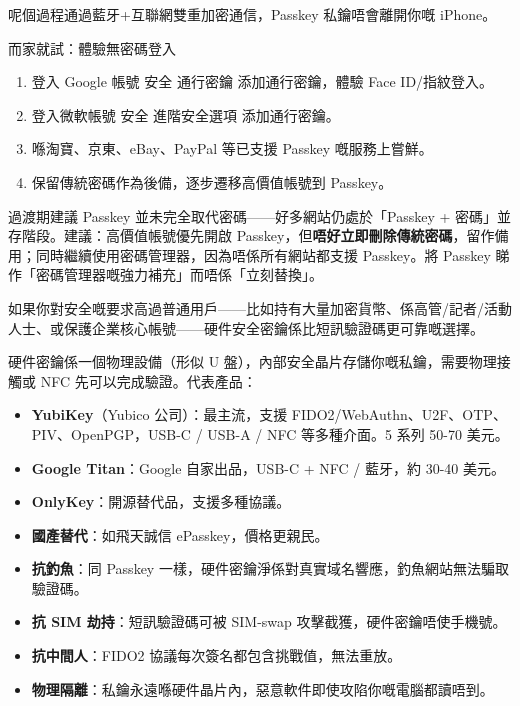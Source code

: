 呢個過程通過藍牙+互聯網雙重加密通信，Passkey 私鑰唔會離開你嘅 iPhone。

\begin{tcbpractice}{而家就試：體驗無密碼登入}
\begin{enumerate}
  \item 登入 Google 帳號 安全 通行密鑰 添加通行密鑰，體驗 Face ID/指紋登入。
  \item 登入微軟帳號 安全 進階安全選項 添加通行密鑰。
  \item 喺淘寶、京東、eBay、PayPal 等已支援 Passkey 嘅服務上嘗鮮。
  \item 保留傳統密碼作為後備，逐步遷移高價值帳號到 Passkey。
\end{enumerate}

\end{tcbpractice}

\begin{tcbwarn}{過渡期建議}
Passkey 並未完全取代密碼——好多網站仍處於「Passkey + 密碼」並存階段。建議：高價值帳號優先開啟 Passkey，但\textbf{唔好立即刪除傳統密碼}，留作備用；同時繼續使用密碼管理器，因為唔係所有網站都支援 Passkey。將 Passkey 睇作「密碼管理器嘅強力補充」而唔係「立刻替換」。

\end{tcbwarn}


如果你對安全嘅要求高過普通用戶——比如持有大量加密貨幣、係高管/記者/活動人士、或保護企業核心帳號——硬件安全密鑰係比短訊驗證碼更可靠嘅選擇。


硬件密鑰係一個物理設備（形似 U 盤），內部安全晶片存儲你嘅私鑰，需要物理接觸或 NFC 先可以完成驗證。代表產品：

\begin{itemize}
  \item \textbf{YubiKey}（Yubico 公司）：最主流，支援 FIDO2/WebAuthn、U2F、OTP、PIV、OpenPGP，USB-C / USB-A / NFC 等多種介面。5 系列 50-70 美元。
  \item \textbf{Google Titan}：Google 自家出品，USB-C + NFC / 藍牙，約 30-40 美元。
  \item \textbf{OnlyKey}：開源替代品，支援多種協議。
  \item \textbf{國產替代}：如飛天誠信 ePasskey，價格更親民。
\end{itemize}


\begin{itemize}
  \item \textbf{抗釣魚}：同 Passkey 一樣，硬件密鑰淨係對真實域名響應，釣魚網站無法騙取驗證碼。
  \item \textbf{抗 SIM 劫持}：短訊驗證碼可被 SIM-swap 攻擊截獲，硬件密鑰唔使手機號。
  \item \textbf{抗中間人}：FIDO2 協議每次簽名都包含挑戰值，無法重放。
  \item \textbf{物理隔離}：私鑰永遠喺硬件晶片內，惡意軟件即使攻陷你嘅電腦都讀唔到。
\end{itemize}

